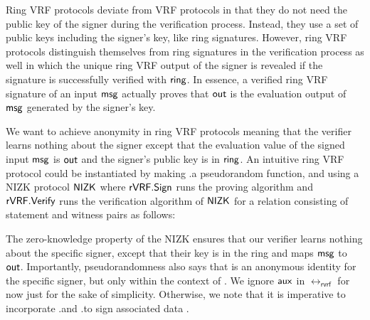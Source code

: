 Ring VRF protocols deviate from VRF protocols in that they do not need the public key of the signer during the verification process. Instead, they use a set of public keys including the signer's key, like ring signatures. However, ring VRF protocols distinguish themselves from ring signatures   in the verification process as well  in which the unique ring VRF output of the signer is revealed if the signature is successfully verified with $\mathsf{ring}$.
In essence, a verified ring VRF signature of an input  $ \mathsf{msg} $ actually proves that $ {\mathsf{out}} $ is the evaluation output of $ \mathsf{msg} $ generated by the signer's key. 

We want to achieve anonymity in ring VRF protocols meaning that the verifier learns nothing about the signer except that the  evaluation value of the signed input $ \mathsf{msg} $ is $ {\mathsf{out}} $ and the signer's public key is in $ \mathsf{ring} $.
An intuitive ring VRF protocol could be instantiated by making
\rVRF.\Eval a pseudorandom function, and using a NIZK protocol $ {\mathsf{NIZK}} $ where $ {\mathsf{rVRF}}.{\mathsf{Sign}} $ runs the proving algorithm and $ {\mathsf{rVRF}}.{\mathsf{Verify}} $ runs the verification algorithm of $ {\mathsf{NIZK}} $ for a relation consisting of statement and witness pairs as follows:





The zero-knowledge property of the NIZK ensures that our verifier learns nothing about the specific
signer, except that their key is in the ring and maps $\mathsf{msg}$ to ${\mathsf{out}}$.
Importantly, pseudorandomness also says that \Out is an anonymous identity
for the specific signer, but only within the context of \msg. We ignore $ \mathsf{aux} $ in $ \rel_{\mathsf{rvrf}} $ for now just for the sake of simplicity. Otherwise, we note that it is imperative to incorporate \rVRF.\Sign and \rVRF.\Verify to sign associated data \aux. 


